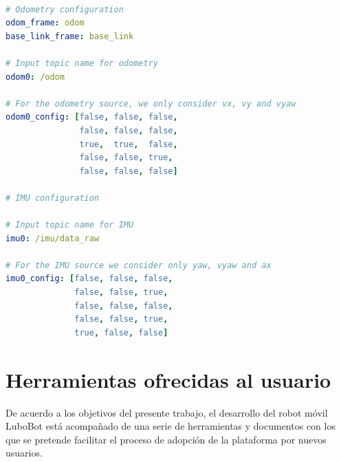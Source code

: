 \makeatother

\newcommand\ProcessThreeDashes{\llap{\color{cyan}\mdseries-{-}-}}

\begin{lstlisting}[language=yaml, label=cod:rosLocalization, caption=Configuraciones del filtro proveído por el paquete ros\_localization .\protect\footnotemark]

# Odometry configuration
odom_frame: odom
base_link_frame: base_link

# Input topic name for odometry
odom0: /odom

# For the odometry source, we only consider vx, vy and vyaw
odom0_config: [false, false, false,
               false, false, false,
               true,  true,  false,
               false, false, true,
               false, false, false]

# IMU configuration

# Input topic name for IMU
imu0: /imu/data_raw

# For the IMU source we consider only yaw, vyaw and ax
imu0_config: [false, false, false,
              false, false, true,
              false, false, false,
              false, false, true,
              true, false, false]

\end{lstlisting}



\section{Herramientas ofrecidas al usuario}

De acuerdo a los objetivos del presente trabajo, el desarrollo del robot móvil LuboBot está acompañado de una serie de herramientas y documentos con los que se pretende facilitar el proceso de adopción de la plataforma por nuevos usuarios.

